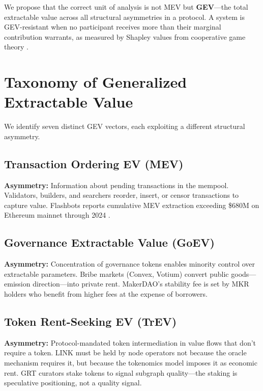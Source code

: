 \documentclass[11pt, a4paper]{article}
\begin{document}
We propose that the correct unit of analysis is not MEV but \textbf{GEV}---the total extractable value across all structural asymmetries in a protocol. A system is GEV-resistant when no participant receives more than their marginal contribution warrants, as measured by Shapley values from cooperative game theory \citep{shapley1953}.

\section{Taxonomy of Generalized Extractable Value}

We identify seven distinct GEV vectors, each exploiting a different structural asymmetry.

\subsection{Transaction Ordering EV (MEV)}

\textbf{Asymmetry:} Information about pending transactions in the mempool. Validators, builders, and searchers reorder, insert, or censor transactions to capture value. Flashbots reports cumulative MEV extraction exceeding \$680M on Ethereum mainnet through 2024 \citep{flashbots2024}.

\subsection{Governance Extractable Value (GoEV)}

\textbf{Asymmetry:} Concentration of governance tokens enables minority control over extractable parameters. Bribe markets (Convex, Votium) convert public goods---emission direction---into private rent. MakerDAO's stability fee is set by MKR holders who benefit from higher fees at the expense of borrowers.

\subsection{Token Rent-Seeking EV (TrEV)}

\textbf{Asymmetry:} Protocol-mandated token intermediation in value flows that don't require a token. LINK must be held by node operators not because the oracle mechanism requires it, but because the tokenomics model imposes it as economic rent. GRT curators stake tokens to signal subgraph quality---the staking is speculative positioning, not a quality signal.
\end{document}
